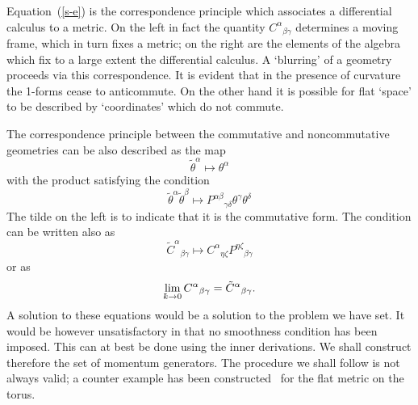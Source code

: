\documentclass[12pt,a4paper]{article}
\newcounter{eg}
\def\t#1{\tilde #1}
\def\kbar{{\mathchar'26\mkern-9muk}}
\begin{document}
Equation~(\ref{s-e}) is the correspondence principle which associates
a differential calculus to a metric.  On the left in fact the quantity
$C^\alpha{}_{\beta\gamma}$ determines a moving frame, which in turn
fixes a metric; on the right are the elements of the algebra which fix
to a large extent the differential calculus. A `blurring' of a
geometry proceeds via this correspondence. It is evident that in the
presence of curvature the 1-forms cease to anticommute. On the other
hand it is possible for flat `space' to be described by `coordinates'
which do not commute.  

The correspondence principle between the commutative and
noncommutative geometries can be also described as the map
\begin{equation}
\t{\theta^\alpha}  \mapsto \theta^\alpha                      \label{cp}
\end{equation}
with the product satisfying the condition
\begin{equation}
\t{\theta^\alpha} \t{\theta^\beta} \mapsto 
P^{\alpha\beta}{}_{\gamma\delta} \theta^\gamma \theta^\delta      \label{cp0}
\end{equation}
The tilde on the left is to indicate that it is the commutative form.
The condition can be written also as
$$
\t{C}^\alpha{}_{\beta\gamma} \mapsto 
C^\alpha{}_{\eta\zeta} P^{\eta\zeta}{}_{\beta\gamma}
$$
or as 
$$
\lim_{\kbar\to 0}C^\alpha{}_{\beta\gamma} = \t{C}^\alpha{}_{\beta\gamma}.
$$
A solution to these equations would be a solution to the problem we
have set. It would be however unsatisfactory in that no smoothness
condition has been imposed. This can at best be done using the inner
derivations. We shall construct therefore the set of momentum
generators. The procedure we shall follow is not always valid; a
counter example has been constructed~\cite{MadSae98} for the flat
metric on the torus.
\end{document}
